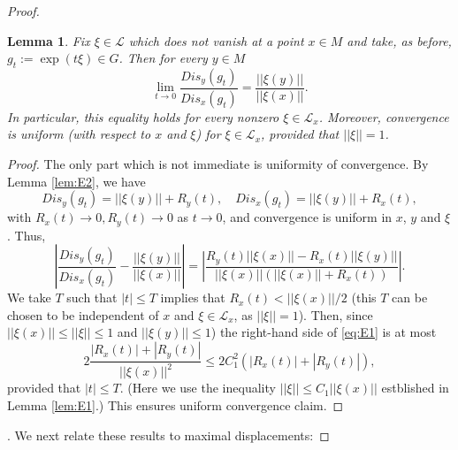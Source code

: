 \documentclass[12pt]{amsbook}%
\newtheorem{lem}[thm]{Lemma}
\theoremstyle{definition}
\theoremstyle{remark}
\numberwithin{section}{chapter}
\numberwithin{subsection}{section}
\numberwithin{figure}{chapter}
\def\cL{{\mathscr{L}}}
\def\mini{\scriptsize}
\begin{document}
{{\begin{proof}
\begin{lem}\label{lem:E3}
Fix $\xi\in \cL$ which does not vanish at a point $x\in M$ and take, as before, $g_t:= \exp(t\xi)\in G$. 
Then for every $y\in M$ 
$$
\lim_{t\to 0} \frac{Dis_y(g_t)}{Dis_x(g_t)}= \frac{||\xi(y)||}{||\xi(x)||}. 
$$
In particular, this equality holds for every nonzero $\xi\in \cL_x$. Moreover, convergence is uniform (with respect to $x$ and $\xi$) 
for $\xi\in \cL_x$, provided that  $||\xi||= 1$. 
\end{lem}
\begin{proof} The only part which is not immediate is uniformity of convergence. By Lemma \ref{lem:E2}, we have
$$
Dis_y(g_t)= ||\xi(y)|| + R_y(t), \quad Dis_x(g_t)= ||\xi(y)|| + R_x(t),
$$
with $R_x(t)\to 0, R_y(t)\to 0$ as $t\to 0$, and convergence is uniform in $x$, $y$ and $\xi$. Thus,
 \begin{equation}\label{eq:E1}
 \left| \frac{Dis_y(g_t)}{Dis_x(g_t)}- \frac{||\xi(y)||}{||\xi(x)||}\right|= \left|\frac{R_y(t)||\xi(x)|| - R_x(t) ||\xi(y)||}{||\xi(x)|| (||\xi(x)|| + R_x(t))}\right|. 
 \end{equation}
We take $T$ such that $|t|\leqslant T$ implies that $R_x(t)<||\xi(x)||/2$ (this $T$ can be chosen to be independent of $x$ and $\xi\in \cL_x$, as $||\xi||=1$). 
Then, since $||\xi(x)||\leqslant ||\xi||\leqslant 1$ and $||\xi(y)||\leqslant 1$)  the right-hand side of \eqref{eq:E1} is at most
$$
2\frac{|R_x(t)| + |R_y(t)|}{||\xi(x)||^2}\leqslant 2 C_1^2 \left(|R_x(t)| + |R_y(t)| \right), 
$$
provided that $|t|\leqslant T$. (Here we use the inequality $||\xi||\leqslant C_1||\xi(x)||$ estblished in Lemma \ref{lem:E1}.) 
This ensures uniform convergence claim. \end{proof}

. We next relate these results to maximal displacements: 



\end{proof}}}
\end{document}
